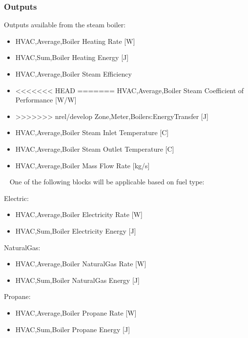 \subsubsection{Outputs}\label{outputs-11-004}

Outputs available from the steam boiler:

\begin{itemize}
    \item
    HVAC,Average,Boiler Heating Rate {[}W{]}
    \item
    HVAC,Sum,Boiler Heating Energy {[}J{]}
    \item
    HVAC,Average,Boiler Steam Efficiency
    \item
<<<<<<< HEAD
=======
    HVAC,Average,Boiler Steam Coefficient of Performance {[}W/W{]}
    \item
>>>>>>> nrel/develop
    Zone,Meter,Boilers:EnergyTransfer {[}J{]}
    \item
    HVAC,Average,Boiler Steam Inlet Temperature {[}C{]}
    \item
    HVAC,Average,Boiler Steam Outlet Temperature {[}C{]}
    \item
    HVAC,Average,Boiler Mass Flow Rate {[}kg/s{]}
\end{itemize}

~ One of the following blocks will be applicable based on fuel type:

Electric:

\begin{itemize}
    \item
    HVAC,Average,Boiler Electricity Rate {[}W{]}
    \item
    HVAC,Sum,Boiler Electricity Energy {[}J{]}
\end{itemize}

NaturalGas:

\begin{itemize}
    \item
    HVAC,Average,Boiler NaturalGas Rate {[}W{]}
    \item
    HVAC,Sum,Boiler NaturalGas Energy {[}J{]}
\end{itemize}

Propane:

\begin{itemize}
    \item
    HVAC,Average,Boiler Propane Rate {[}W{]}
    \item
    HVAC,Sum,Boiler Propane Energy {[}J{]}
\end{itemize}

